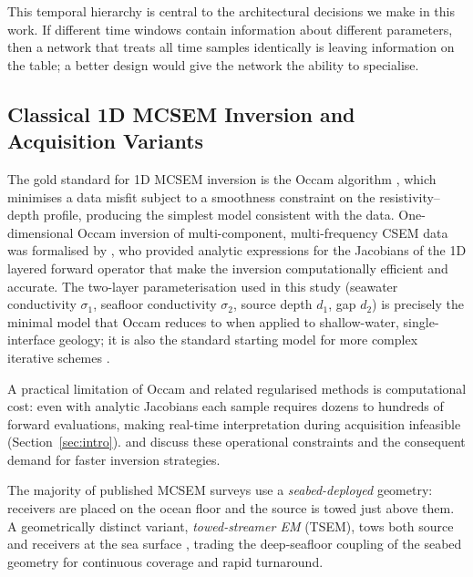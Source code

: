 \documentclass[journal]{IEEEtran}
\begin{document}
This temporal hierarchy is central to the architectural decisions we
make in this work. If different time windows contain information about
different parameters, then a network that treats all time samples
identically is leaving information on the table; a better design
would give the network the ability to specialise.

\subsection{Classical 1D MCSEM Inversion and Acquisition Variants}
\label{sec:classical_inv}

The gold standard for 1D MCSEM inversion is the Occam algorithm
\citep{constable1987occam}, which minimises a data misfit subject to
a smoothness constraint on the resistivity--depth profile, producing
the simplest model consistent with the data.  One-dimensional Occam
inversion of multi-component, multi-frequency CSEM data was
formalised by \citet{key2009}, who provided analytic expressions for
the Jacobians of the 1D layered forward operator that make the
inversion computationally efficient and accurate.  The two-layer
parameterisation used in this study (seawater conductivity $\sigma_1$,
seafloor conductivity $\sigma_2$, source depth $d_1$, gap
$d_2$) is precisely the minimal model that Occam reduces to when
applied to shallow-water, single-interface geology; it is also the
standard starting model for more complex iterative schemes
\citep{constable2006, key2012marine}.

A practical limitation of Occam and related regularised methods is
computational cost: even with analytic Jacobians each sample requires
dozens to hundreds of forward evaluations, making real-time
interpretation during acquisition infeasible (Section~\ref{sec:intro}).
\citet{constable2006} and \citet{key2012marine} discuss these
operational constraints and the consequent demand for faster
inversion strategies.

The majority of published MCSEM surveys use a
\emph{seabed-deployed} geometry: receivers are placed on the ocean
floor and the source is towed just above them.  A geometrically
distinct variant, \emph{towed-streamer EM} (TSEM), tows both source
and receivers at the sea surface \citep{ziolkowski2007}, trading the
deep-seafloor coupling of the seabed geometry for continuous coverage
and rapid turnaround.
\end{document}
